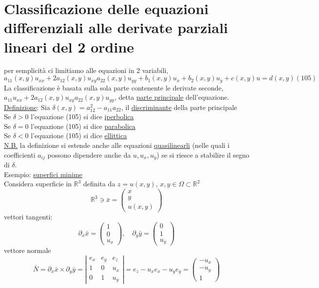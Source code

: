 \documentclass[a4paper,11pt]{report}
\newcommand{\R}{\mathbb{R}}
\newcommand{\x}{\bar{x}}
\newcommand{\y}{\bar{y}}
\begin{document}
\chapter{Classificazione delle equazioni differenziali alle derivate parziali lineari del 2 ordine}
per semplicità ci limitiamo alle equazioni in 2 variabili, 
\begin{equation}
a_{11}(x,y)u_{xx} + 2a_{12}(x,y)u_{xy} a_{22}(x,y)u_{yy} + b_{1}(x,y)u_{x} + b_2(x,y)u_y + c(x,y)u = d(x,y) (105)
\end{equation}
La classificazione è basata sulla sola parte contenente le derivate seconde, $a_{11}u_{xx} + 2a_{12}(x,y)u_{xy} a_{22}(x,y)u_{yy}$, detta \underline{parte principale} dell'equazione.\\
\underline{Definizione}: Sia $\delta(x,y)=a_{12}^2 - a_{11}a_{22}$, il \underline{discriminante} della parte principale\\
Se $\delta >0$ l'equazione (105) si dice \underline{iperbolica}\\
Se $\delta =0$ l'equazione (105) si dice \underline{parabolica}\\
Se $\delta <0$ l'equazione (105) si dice \underline{ellittica}\\
\underline{N.B.} la definizione si estende anche alle equazioni \underline{quasilinearli} (nelle quali i coefficienti $a_{ij}$ possono dipendere anche da $u, u_x,u_y$) se si riesce a stabilire il segno di $\delta$.\\
Esempio: \underline{superfici minime}\\
Considera superficie in $\R^3$ definita da $z=u(x,y)$, $x,y \in \Omega \subset \R^2$
$$
\R^3 \ni \x = \left( \begin{matrix}
x\\
y\\
u(x,y)
\end{matrix}\right)
$$
vettori tangenti:
$$
\partial_x \x = \left( \begin{matrix}
1\\
0\\
u_x
\end{matrix}\right) ,\quad 
\partial_y \y = \left( \begin{matrix}
0\\
1\\
u_y
\end{matrix}\right)
$$
vettore normale
$$
\bar{N}=\partial_x \x \times \partial_y\y=\left| \begin{matrix}
e_x & e_y & e_z \\
1 & 0 & u_x \\
0 & 1 & u_y
\end{matrix}\right| = e_z-u_xe_x - u_y e_y = \left( \begin{matrix}
-u_x \\
-u_y \\
1
\end{matrix}\right)
$$
\end{document}
